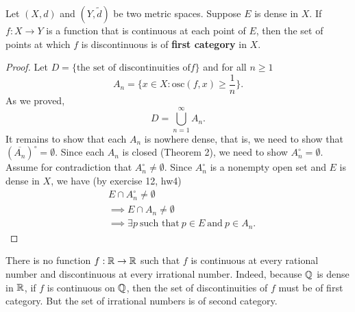 \begin{theorem}[ ]
    Let \( (X,d) \) and \( (Y,\tilde{d}) \) be two metric spaces. Suppose \( E  \) is dense in \( X  \). If \( f: X \to Y  \) is a function that is continuous at each point of \( E  \), then the set of points at which \( f  \) is discontinuous is of \textbf{first category} in \( X  \).
\end{theorem}
\begin{proof}
    Let \( D = \{ \text{the set of discontinuities of} f \}  \) and for all \( n \geq 1  \) 
    \[  {A}_{n} = \{  x \in X : \text{osc}(f,x) \geq \frac{1  }{ n } \}. \]
    As we proved, 
    \[  D = \bigcup_{ n=1  }^{ \infty  }  {A}_{n}. \]
    It remains to show that each \( {A}_{n} \) is nowhere dense, that is, we need to show that \( (\overline{{A}_{n}})^{\circ} = \emptyset \). Since each \( {A}_{n} \) is closed (Theorem 2), we need to show \( {A}_{n}^{\circ} = \emptyset \). Assume for contradiction that \( {A}_{n}^{\circ} \neq \emptyset \). Since \( {A}_{n}^{\circ}  \) is a nonempty open set and \( E  \) is dense in \( X  \), we have (by exercise 12, hw4) 
    \begin{align*}
         &E \cap {A}_{n}^{\circ} \neq \emptyset \\
         &\implies E \cap {A}_{n} \neq \emptyset \\
         &\implies \exists  p \  \text{such that} \ p \in E \ \text{and} \ p \in {A}_{n}.
    \end{align*}

\end{proof}

\begin{remark}
    There is no function \( f: \mathbb{R} \to \mathbb{R}  \) such that \( f  \) is continuous at every rational number and discontinuous at every irrational number. Indeed, because \( \mathbb{Q}  \) is dense in \( \mathbb{R}  \), if \( f  \) is continuous on \( \mathbb{Q}  \), then the set of discontinuities of \( f  \) must be of first category. But the set of irrational numbers is of second category. 
\end{remark}
